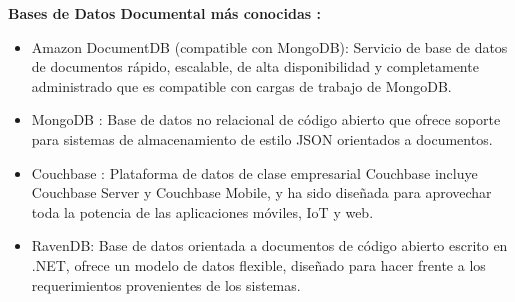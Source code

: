 \documentclass[%
 reprint,
 amsmath,amssymb,
 aps,
]{revtex4-1}
\begin{document}
\textbf{Bases de Datos Documental más conocidas :}
\begin{itemize}
		\item Amazon DocumentDB (compatible con MongoDB): Servicio de base de datos de documentos rápido, escalable, de alta disponibilidad y completamente administrado que es compatible con cargas de trabajo de MongoDB.
		\item MongoDB : Base de datos no relacional de código abierto que ofrece soporte para sistemas de almacenamiento de estilo JSON orientados a documentos.
		\item Couchbase : Plataforma de datos de clase empresarial Couchbase incluye Couchbase Server y Couchbase Mobile, y ha sido diseñada para aprovechar toda la potencia de las aplicaciones móviles, IoT y web. 
		\item RavenDB:  Base de datos orientada a documentos de código abierto escrito en .NET, ofrece un modelo de datos flexible, diseñado para hacer frente a los requerimientos provenientes de los sistemas.                     
\end{itemize}
\end{document}

